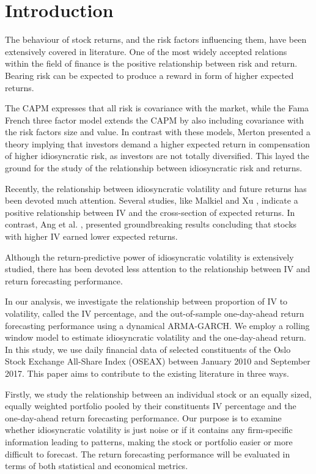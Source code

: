 \chapter{Introduction}
The behaviour of stock returns, and the risk factors influencing them, have been extensively covered in literature. One of the most widely accepted relations
within the field of finance is the positive relationship between risk and return. Bearing risk can be expected to produce a reward in form of higher expected returns.

The CAPM expresses that all risk is covariance with the market, while the Fama French three factor model \cite{famafrench} extends the CAPM by also including covariance with the risk factors size and value. In contrast with these models, Merton \cite{merton87} presented a theory implying that investors demand a higher expected return in compensation of higher idiosyncratic risk, as investors are not totally diversified. This layed the ground for the study of the relationship between idiosyncratic risk and returns.

Recently, the relationship between idiosyncratic volatility and future returns has been devoted much attention. Several studies, like Malkiel and Xu \cite{malkielxu02}, indicate a positive relationship between IV and the cross-section of expected returns. In contrast, Ang et al. \cite{angetal06}, presented groundbreaking results concluding that stocks with higher IV earned lower expected returns.

Although the return-predictive power of idiosyncratic volatility is extensively studied, there has been devoted less attention to the relationship between IV and return forecasting performance. 

In our analysis, we investigate the relationship between proportion of IV to volatility, called the IV percentage, and the out-of-sample one-day-ahead return forecasting performance using a dynamical ARMA-GARCH. We employ a rolling window
model to estimate idiosyncratic volatility and the one-day-ahead return. In this study, we use daily financial data of selected constituents of the Oslo Stock Exchange All-Share Index (OSEAX) between January 2010 and September 2017. This paper aims to contribute to the existing literature in three ways. 

Firstly, we study the relationship between an individual stock or an equally sized, equally weighted portfolio pooled by their constituents IV percentage and the one-day-ahead return forecasting performance. Our purpose is to examine whether idiosyncratic volatility is just noise or if it contains any firm-specific information leading to patterns, making the stock or portfolio easier or more difficult to forecast. The return forecasting performance will be evaluated in terms of both statistical and economical metrics.

